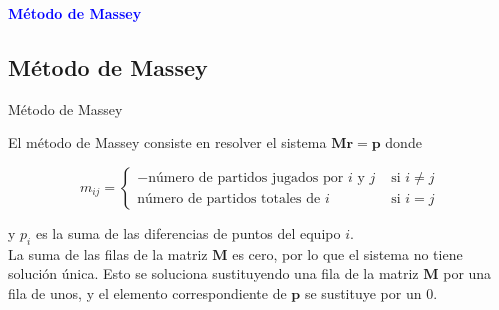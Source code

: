 \documentclass[10pt]{beamer}
\begin{document}
	\begin{frame}
		\begin{center}
			\Huge\textbf{\textsf{\textcolor{blue}{Método de Massey}}}
		\end{center}
	\end{frame}
	
	
	\subsection{Método de Massey}
	
	\begin{frame}{Método de Massey}
		
		El método de Massey consiste en resolver el sistema $\mathbf{M r} = \mathbf{p}$
		donde 
		
		\[ m_{ij} = \begin{cases}
		- \text{número de partidos jugados por } i \text{ y } j & \text{ si } i \neq j \\
	      \text{número de partidos totales de } i & \text{ si } i = j 
		
		\end{cases}\]
		
		y $p_i$ es la suma de las diferencias de puntos del equipo $i$.\\
		
		La suma de las filas de la matriz $\mathbf{M}$ es cero, por lo que el sistema no tiene solución única. Esto se soluciona sustituyendo una fila de la matriz $\mathbf{M}$ por una fila de unos, y el elemento correspondiente de $\mathbf{p}$ se sustituye por un $0$.
	
	\end{frame}
	
\end{document}

